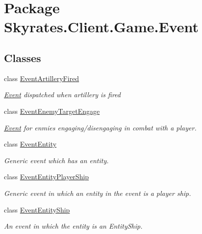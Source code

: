 \hypertarget{namespace_skyrates_1_1_client_1_1_game_1_1_event}{\section{Package Skyrates.\-Client.\-Game.\-Event}
\label{namespace_skyrates_1_1_client_1_1_game_1_1_event}
}
\subsection*{Classes}
\begin{DoxyCompactItemize}
\item 
class \hyperlink{class_skyrates_1_1_client_1_1_game_1_1_event_1_1_event_artillery_fired}{Event\-Artillery\-Fired}
\begin{DoxyCompactList}\small\item\em \hyperlink{namespace_skyrates_1_1_client_1_1_game_1_1_event}{Event} dispatched when artillery is fired \end{DoxyCompactList}\item 
class \hyperlink{class_skyrates_1_1_client_1_1_game_1_1_event_1_1_event_enemy_target_engage}{Event\-Enemy\-Target\-Engage}
\begin{DoxyCompactList}\small\item\em \hyperlink{namespace_skyrates_1_1_client_1_1_game_1_1_event}{Event} for enmies engaging/disengaging in combat with a player. \end{DoxyCompactList}\item 
class \hyperlink{class_skyrates_1_1_client_1_1_game_1_1_event_1_1_event_entity}{Event\-Entity}
\begin{DoxyCompactList}\small\item\em Generic event which has an entity. \end{DoxyCompactList}\item 
class \hyperlink{class_skyrates_1_1_client_1_1_game_1_1_event_1_1_event_entity_player_ship}{Event\-Entity\-Player\-Ship}
\begin{DoxyCompactList}\small\item\em Generic event in which an entity in the event is a player ship. \end{DoxyCompactList}\item 
class \hyperlink{class_skyrates_1_1_client_1_1_game_1_1_event_1_1_event_entity_ship}{Event\-Entity\-Ship}
\begin{DoxyCompactList}\small\item\em An event in which the entity is an Entity\-Ship. \end{DoxyCompactList}\item 

\end{DoxyCompactItemize}
